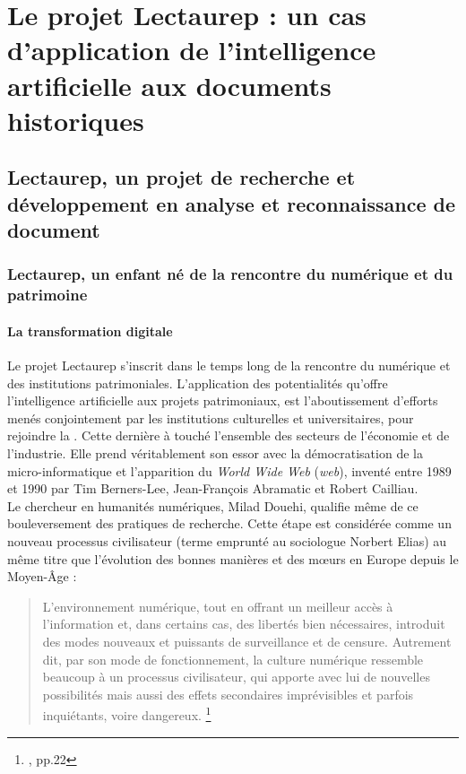 \part{Le projet Lectaurep : un cas d'application de l'\og intelligence artificielle\fg{} aux documents historiques}\label{partie_1}

\chapter{Lectaurep, un projet de recherche et développement en analyse et reconnaissance de document}

\section{Lectaurep, un enfant né de la rencontre du numérique et du patrimoine}

\subsection{La transformation digitale}

Le projet Lectaurep s'inscrit dans le temps long de la rencontre du numérique et des institutions patrimoniales. L'application des potentialités qu'offre l'intelligence artificielle aux projets patrimoniaux, est l'aboutissement d'efforts menés conjointement par les institutions culturelles et universitaires, pour rejoindre la . Cette dernière à touché l'ensemble des secteurs de l'économie et de l'industrie. 
Elle prend véritablement son essor avec la démocratisation de la micro-informatique et l'apparition du \textit{World Wide Web} (\textit{web}), inventé entre 1989 et 1990 par Tim Berners-Lee, Jean-François Abramatic et Robert Cailliau.\\

Le chercheur en humanités numériques, Milad Douehi, qualifie même de  ce bouleversement des pratiques de recherche. Cette étape est considérée comme un nouveau processus civilisateur (terme emprunté au sociologue Norbert Elias) au même titre que l'évolution des bonnes manières et des m\oe{}urs en Europe depuis le Moyen-Âge : 
\newpage
\begin{quote}
    L'environnement numérique, tout en offrant un meilleur accès à l'information et, dans certains cas, des libertés bien nécessaires, introduit des modes nouveaux et puissants de surveillance et de censure. Autrement dit, par son mode de fonctionnement, la culture numérique ressemble beaucoup à un processus civilisateur, qui apporte avec lui de nouvelles possibilités mais aussi des effets secondaires imprévisibles et parfois inquiétants, voire dangereux. \footnote{\cite{doueihi_grande_2011}, pp.22}
\end{quote}

